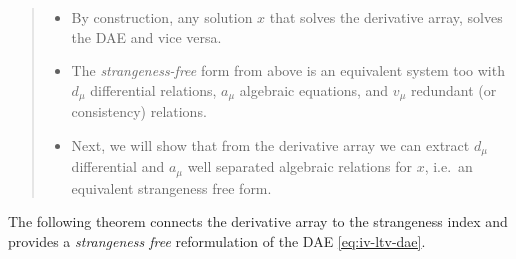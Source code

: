 \documentclass[]{book}
\providecommand{\tightlist}{%
  \setlength{\itemsep}{0pt}\setlength{\parskip}{0pt}}
\newenvironment {JHSAYS} [0] {\begin{quote}\color{jhsc}} {\end{quote}}
\theoremstyle{definition}
\theoremstyle{definition}
\theoremstyle{definition}
\theoremstyle{definition}
\theoremstyle{remark}
\begin{document}
\begin{JHSAYS}
\begin{itemize}
\tightlist
\item
  By construction, any solution \(x\) that solves the derivative array, solves the DAE and vice versa.
\item
  The \emph{strangeness-free} form from above is an equivalent system too with \(d_\mu\) differential relations, \(a_\mu\) algebraic equations, and \(v_\mu\) redundant (or consistency) relations.
\item
  Next, we will show that from the derivative array we can extract \(d_\mu\) differential and \(a_\mu\) well separated algebraic relations for \(x\), i.e.~an equivalent strangeness free form.
\end{itemize}
\end{JHSAYS}

The following theorem connects the derivative array to the strangeness index and provides a \emph{strangeness free} reformulation of the DAE \eqref{eq:iv-ltv-dae}.
\end{document}
